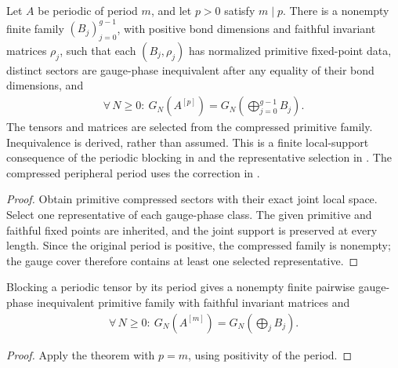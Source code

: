 \begin{lemma}
    \label{thm:periodic_ground_state_presentation}
    \leanok
    Let $A$ be periodic of period $m$, and let $p>0$ satisfy $m\mid p$.
    There is a nonempty finite family $(B_j)_{j=0}^{g-1}$, with positive
    bond dimensions and faithful invariant matrices $\rho_j$, such that
    each $(B_j,\rho_j)$ has normalized primitive fixed-point data, distinct
    sectors are gauge-phase inequivalent after any equality of their bond
    dimensions, and
    \begin{align}
        \forall\,N\geq0:\ G_N(A^{[p]})=G_N\left(\bigoplus_{j=0}^{g-1}B_j\right).
    \end{align}
    The tensors and matrices are selected from the compressed primitive
    family. Inequivalence is derived, rather than assumed.
    This is a finite local-support consequence of the periodic blocking in
    \cite[Lemma~6]{DeLasCuevas2017Irreducible} and the representative selection
    in \cite[Proposition~2.7, Theorem~2.10]{Cirac2016MPDO_arXiv}.
    The compressed peripheral period uses the correction in
    \cite{gap:dccsp17_blocking_peripheral_roots}.
\end{lemma}
\begin{proof}\leanok
    Obtain primitive compressed sectors with their exact joint local space.
    Select one representative of each gauge-phase class. The given
    primitive and faithful fixed points are inherited, and the joint support
    is preserved at every length. Since the original period is positive,
    the compressed family is nonempty; the gauge cover therefore contains
    at least one selected representative.
\end{proof}

\begin{lemma}
    \label{thm:periodic_ground_state_presentation_at_period}
    \leanok
    Blocking a periodic tensor by its period gives a nonempty finite
    pairwise gauge-phase inequivalent primitive family with faithful
    invariant matrices and
    \begin{align}
        \forall\,N\geq0:\ G_N(A^{[m]})=G_N\left(\bigoplus_jB_j\right).
    \end{align}
\end{lemma}
\begin{proof}\leanok
    Apply the theorem with $p=m$, using positivity of the period.
\end{proof}

